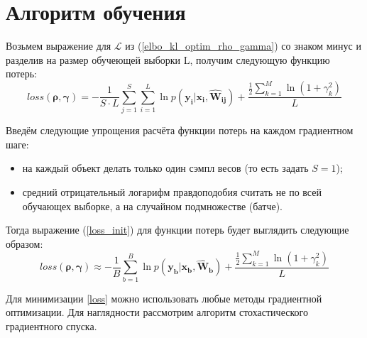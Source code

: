 \documentclass{article}
\numberwithin{equation}{section}
\begin{document}
    \section{Алгоритм обучения}
    Возьмем выражение для $\mathcal{L}$ из (\ref{elbo_kl_optim_rho_gamma})
    со знаком минус и разделив на размер обучеющей выборки L,
    получим следующую функцию потерь:
    \begin{equation}\label{loss_init}
        loss(\pmb{\rho}, \pmb{\gamma})
        =
            - \frac
                {1}
                {S \cdot L}
            \sum_{j=1}^S
            \sum_{i=1}^{L}
                {\ln{
                    p(\pmb{y_{i}} | \pmb{x_{i}}, \pmb{\hat{W}_{ij}})
                }
            }
            +
            \frac
                {
                    \frac{1}{2} \sum_{k=1}^{M} \ln(
                        {1 + \gamma_{k}^{2}}
                    )
                }
                {L}
    \end{equation}

    Введём следующие упрощения расчёта функции потерь на каждом градиентном шаге:
    \begin{itemize}
        \item на каждый объект делать только один сэмпл весов (то есть задать $S=1$);
        \item средний отрицательный логарифм правдоподобия считать не по всей обучающех выборке,
            а на случайном подмножестве (батче).
    \end{itemize}

    Тогда выражение (\ref{loss_init}) для функции потерь будет выглядить следующие образом:
    \begin{equation}\label{loss}
        loss(\pmb{\rho}, \pmb{\gamma})
        \approx
            - \frac{1}{B}
            \sum_{b=1}^{B}
                {\ln{
                    p(\pmb{y_{b}} | \pmb{x_{b}}, \pmb{\hat{W}_{b}})
                }
            }
            +
            \frac
                {
                    \frac{1}{2} \sum_{k=1}^{M} \ln(
                        {1 + \gamma_{k}^{2}}
                    )
                }
                {L}
    \end{equation}

    Для минимизации \ref{loss} можно использовать любые методы градиентной оптимизации.
    Для наглядности рассмотрим алгоритм стохастического градиентного спуска.
\end{document}
